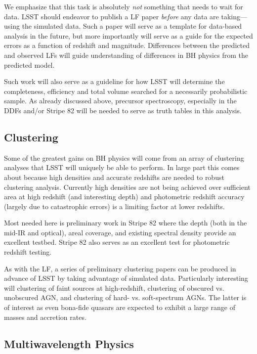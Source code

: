 We emphasize that this task is absolutely {\em not} something that needs to wait for data.  LSST should endeavor to publish a LF paper {\em before} any data are taking---using the simulated data.  Such a paper will serve as a template for data-based analysis in the future, but more importantly will serve as a guide for the expected errors as a function of redshift and magnitude.  Differences between the predicted and observed LFs will guide understanding of differences in BH physics from the predicted model.

Such work will also serve as a guideline for how LSST will determine the completeness, efficiency and total volume searched for a necessarily probabilistic sample.  As already discussed above, precursor spectroscopy, especially in the DDFs and/or Stripe 82 will be needed to serve as truth tables in this analysis.

\subsection{Clustering}

Some of the greatest gains on BH physics will come from an array of clustering analyses that LSST will uniquely be able to perform.  In large part this comes about because high densities and accurate redshifts are needed to robust clustering analysis.  Currently high densities are not being achieved over sufficient area at high redshift (and interesting depth) and photometric redshift accuracy (largely due to catastrophic errors) is a limiting factor at lower redshifts.  

Most needed here is preliminary work in Stripe 82 where the depth (both in the mid-IR and optical), areal coverage, and existing spectral density provide an excellent testbed.  Stripe 82 also serves as an excellent test for photometric redshift testing.

As with the LF, a series of preliminary clustering papers can be produced in advance of LSST by taking advantage of simulated data.  Particularly interesting will clustering of faint sources at high-redshift, clustering of obscured vs. unobscured AGN, and clustering of hard- vs. soft-spectrum AGNs.  The latter is of interest as even bona-fide quasars are expected to exhibit a large range of masses and accretion rates.


\subsection{Multiwavelength Physics}

